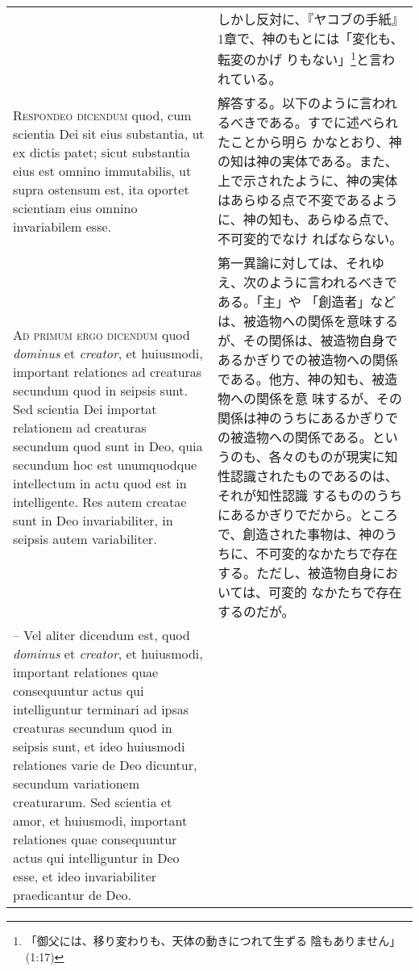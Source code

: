 \documentclass[10pt]{jsarticle} %
\begin{document}
\begin{longtable}{p{21em}p{21em}}
&

しかし反対に、『ヤコブの手紙』1章で、神のもとには「変化も、転変のかげ
りもない」\footnote{「御父には、移り変わりも、天体の動きにつれて生ずる
陰もありません」(1:17)}と言われている。

\\


{\scshape Respondeo dicendum} quod, cum scientia Dei sit eius
substantia, ut ex dictis patet; sicut substantia eius est omnino
immutabilis, ut supra ostensum est, ita oportet scientiam eius omnino
invariabilem esse.

&

解答する。以下のように言われるべきである。すでに述べられたことから明ら
かなとおり、神の知は神の実体である。また、上で示されたように、神の実体
はあらゆる点で不変であるように、神の知も、あらゆる点で、不可変的でなけ
ればならない。

\\


{\scshape Ad primum ergo dicendum} quod {\itshape dominus} et
{\itshape creator}, et huiusmodi, important relationes ad creaturas
secundum quod in seipsis sunt. Sed scientia Dei importat relationem ad
creaturas secundum quod sunt in Deo, quia secundum hoc est unumquodque
intellectum in actu quod est in intelligente. Res autem creatae sunt
in Deo invariabiliter, in seipsis autem variabiliter.

&

第一異論に対しては、それゆえ、次のように言われるべきである。「主」や
「創造者」などは、被造物への関係を意味するが、その関係は、被造物自身で
あるかぎりでの被造物への関係である。他方、神の知も、被造物への関係を意
味するが、その関係は神のうちにあるかぎりでの被造物への関係である。とい
うのも、各々のものが現実に知性認識されたものであるのは、それが知性認識
するもののうちにあるかぎりでだから。ところで、創造された事物は、神のう
ちに、不可変的なかたちで存在する。ただし、被造物自身においては、可変的
なかたちで存在するのだが。

\\


-- Vel aliter dicendum est, quod {\itshape dominus} et {\itshape
creator}, et huiusmodi, important relationes quae consequuntur actus
qui intelliguntur terminari ad ipsas creaturas secundum quod in
seipsis sunt, et ideo huiusmodi relationes varie de Deo dicuntur,
secundum variationem creaturarum. Sed scientia et amor, et huiusmodi,
important relationes quae consequuntur actus qui intelliguntur in Deo
esse, et ideo invariabiliter praedicantur de Deo.


\end{longtable}
\end{document}
